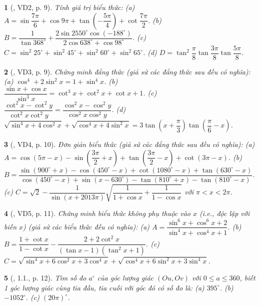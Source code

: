 \documentclass{article}
\newtheorem{baitoan}{}
\begin{document}
\begin{baitoan}[\cite{Hung_nang_cao_phat_trien_Toan_11_tap_1}, VD2, p. 9]
	Tính giá trị biểu thức: (a) $A = \sin\dfrac{7\pi}{6} + \cos9\pi + \tan\left(-\dfrac{5\pi}{4}\right) + \cot\dfrac{7\pi}{2}$. (b) $B = \dfrac{1}{\tan368^\circ} + \dfrac{2\sin2550^\circ\cos(-188^\circ)}{2\cos638^\circ + \cos98^\circ}$. (c) $C = \sin^2 25^\circ + \sin^2 45^\circ + \sin^2 60^\circ + \sin^2 65^\circ$. (d) $D = \tan^2\dfrac{\pi}{8}\tan\dfrac{3\pi}{8}\tan\dfrac{5\pi}{8}$.
\end{baitoan}

\begin{baitoan}[\cite{Hung_nang_cao_phat_trien_Toan_11_tap_1}, VD3, p. 9]
	Chứng minh đẳng thức (giả sử các đẳng thức sau đều có nghĩa): (a) $\cos^4 + 2\sin^2x = 1 + \sin^4x$. (b) $\dfrac{\sin x + \cos x}{\sin^3x} = \cot^3x + \cot^2x + \cot x + 1$. (c) $\dfrac{\cot^2x - \cot^2y}{\cot^2x\cot^2y} = \dfrac{\cos^2x - \cos^2y}{\cos^2x\cos^2y}$. (d) $\sqrt{\sin^4x + 4\cos^2x} + \sqrt{\cos^4x + 4\sin^2x} = 3\tan\left(x + \dfrac{\pi}{3}\right)\tan\left(\dfrac{\pi}{6} - x\right)$.
\end{baitoan}

\begin{baitoan}[\cite{Hung_nang_cao_phat_trien_Toan_11_tap_1}, VD4, p. 10]
	Đơn giản biểu thức (giả sử các đẳng thức sau đều có nghĩa): (a) $A = \cos(5\pi - x) - \sin\left(\dfrac{3\pi}{2} + x\right) + \tan\left(\dfrac{3\pi}{2} - x\right) + \cot(3\pi - x)$. (b) $B = \dfrac{\sin(900^\circ + x) - \cos(450^\circ - x) + \cot(1080^\circ - x) + \tan(630^\circ - x)}{\cos(450^\circ - x) + \sin(x - 630^\circ) - \tan(810^\circ + x) - \tan(810^\circ - x)}$. (c) $C = \sqrt{2} - \dfrac{1}{\sin(x + 2013\pi)}\sqrt{\dfrac{1}{1 + \cos x} + \dfrac{1}{1 - \cos x}}$ với $\pi < x < 2\pi$.
\end{baitoan}

\begin{baitoan}[\cite{Hung_nang_cao_phat_trien_Toan_11_tap_1}, VD5, p. 11]
	Chứng minh biểu thức không phụ thuộc vào $x$ (i.e., độc lập với biến $x$) (giả sử các biểu thức đều có nghĩa): (a) $A = \dfrac{\sin^6x + \cos^6x + 2}{\sin^4x + \cos^4x + 1}$. (b) $B = \dfrac{1 + \cot x}{1 - \cot x} - \dfrac{2 + 2\cot^2x}{(\tan x - 1)(\tan^2x + 1)}$. (c) $C = \sqrt{\sin^4x + 6\cos^2x + 3\cos^4x} + \sqrt{\cos^4x + 6\sin^2x + 3\sin^4x}$.
\end{baitoan}

\begin{baitoan}[\cite{Hung_nang_cao_phat_trien_Toan_11_tap_1}, 1.1., p. 12]
	Tìm số đo $a^\circ$ của góc lượng giác $(Ou,Ov)$ với $0\le a\le360$, biết 1 góc lượng giác cùng tia đầu, tia cuối với góc đó có số đo là: (a) $395^\circ$. (b) $-1052^\circ$. (c) $(20\pi)^\circ$.
\end{baitoan}
\end{document}
